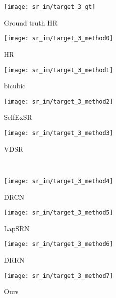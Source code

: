 \documentclass[10pt,twocolumn,letterpaper]{article}
\begin{document}
\begin{figure*}[t!]
\begin{subfigure}{.24\textwidth}
\texttt{[image: sr\_im/target\_3\_gt]}
 \captionsetup{labelformat=empty,font=scriptsize,skip=2pt}
  \caption{Ground truth HR}
\end{subfigure}\hfill
\parbox{.74\textwidth}{
\begin{subfigure}{.24\linewidth}
\texttt{[image: sr\_im/target\_3\_method0]}
\captionsetup{labelformat=empty,font=scriptsize,skip=2pt}
\caption{HR}
\end{subfigure}
\begin{subfigure}{.24\linewidth}
\texttt{[image: sr\_im/target\_3\_method1]}
\captionsetup{labelformat=empty,font=scriptsize,skip=2pt}
\caption{bicubic}
\end{subfigure}
\begin{subfigure}{.24\linewidth}
\texttt{[image: sr\_im/target\_3\_method2]}
\captionsetup{labelformat=empty,font=scriptsize,skip=2pt}
\caption{SelfExSR\cite{huang2015single}}
\end{subfigure}
\begin{subfigure}{.24\linewidth}
\texttt{[image: sr\_im/target\_3\_method3]}
\captionsetup{labelformat=empty,font=scriptsize,skip=2pt}
\caption{VDSR\cite{kim2016accurate}}
\end{subfigure}\\
\begin{subfigure}{.24\linewidth}
\texttt{[image: sr\_im/target\_3\_method4]}
\captionsetup{labelformat=empty,font=scriptsize,skip=2pt}
\caption{DRCN\cite{kim2016deeply}}
\end{subfigure}
\begin{subfigure}{.24\linewidth}
\texttt{[image: sr\_im/target\_3\_method5]}
\captionsetup{labelformat=empty,font=scriptsize,skip=2pt}
\caption{LapSRN\cite{lai2017deep}}
\end{subfigure}
\begin{subfigure}{.24\linewidth}
\texttt{[image: sr\_im/target\_3\_method6]}
\captionsetup{labelformat=empty,font=scriptsize,skip=2pt}
\caption{DRRN\cite{tai2017image}}
\end{subfigure}
\begin{subfigure}{.24\linewidth}
\texttt{[image: sr\_im/target\_3\_method7]}
\captionsetup{labelformat=empty,font=scriptsize,skip=2pt}
\caption{Ours}
\end{subfigure}}


\end{figure*}
\end{document}

